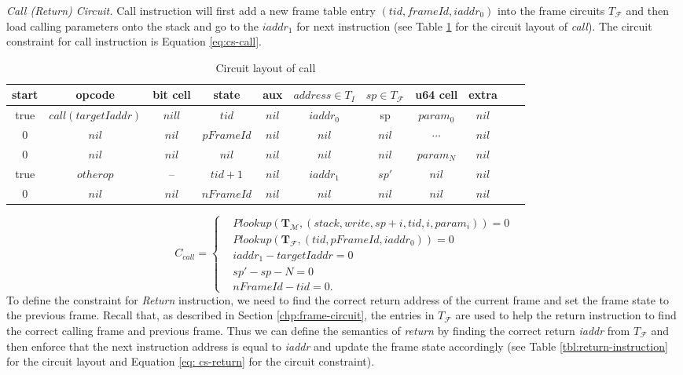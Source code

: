 \noindent\emph{Call (Return) Circuit.}
Call instruction will first add a new frame table entry $(tid, frameId, iaddr_0)$ into the frame circuits $T_\mathcal{F}$ and then load calling parameters onto the stack and go to the $iaddr_1$ for next instruction (see Table \ref{tbl:call-instruction} for the circuit layout of \emph{call}). The circuit constraint for call instruction is Equation \ref{eq:cs-call}.
\begin{table}[!h]
\small
\begin{center}
\caption{Circuit layout of call}
\label{tbl:call-instruction}
\begin{tabular}{ | c | c | c | c | c | c | c | c | c | c | c | }
  \hline
  start & opcode & bit cell & state & aux & $address \in T_{I}$ & $sp \in T_\mathcal{F}$& u64 cell & extra \\ 
  \hline
   true & $call(targetIaddr)$ & $nill$ & $tid$ & $nil$ & $iaddr_0$ & sp & $param_0$ & $nil$\\ 
 \hline
   0 & $nil$ & $nil$ & $pFrameId$ & $nil$ & $nil$ & $nil$ & $\cdots$ & $nil$\\ 
 \hline
   0 & $nil$ & $nil$ & $nil$ & $nil$ & $nil$ & $nil$ & $param_N$ & $nil$\\ 
 \hline
   true & $otherop$ & -- & $tid + 1$ & $nil$ & $iaddr_1$ & $sp'$ & $nil$ & $nil$\\
 \hline
   0 & $nil$ & $nil$ & $nFrameId$ & $nil$ & $nil$ & $nil$ & $nil$ & $nil$\\ 
 \hline
\end{tabular}

\end{center}
\end{table}
\begin{equation}
    C_{call} = \begin{cases}
        &Plookup(\mathbf{T}_\mathcal{M}, (stack, write, sp+i, tid, i, param_i)) = 0 \\
        &Plookup(\mathbf{T}_\mathcal{F}, (tid, pFrameId, iaddr_0)) = 0 \\
        &iaddr_1 - targetIaddr = 0\\
        &sp' - sp - N = 0 \\
        &nFrameId - tid = 0.
    \end{cases}
\label{eq:cs-call}
\end{equation}
 To define the constraint for \emph{Return} instruction, we need to find the correct return address of the current frame and set the frame state to the previous frame. Recall that, as described in Section \ref{chp:frame-circuit}, the entries in $T_\mathcal{F}$ are used to help the return instruction to find the correct calling frame and previous frame. Thus we can define the semantics of \emph{return} by finding the correct return \emph{iaddr} from $T_\mathcal{F}$ and then enforce that the next instruction address is equal to \emph{iaddr} and update the frame state accordingly (see Table \ref{tbl:return-instruction} for the circuit layout and Equation \ref{eq: cs-return} for the circuit constraint).
